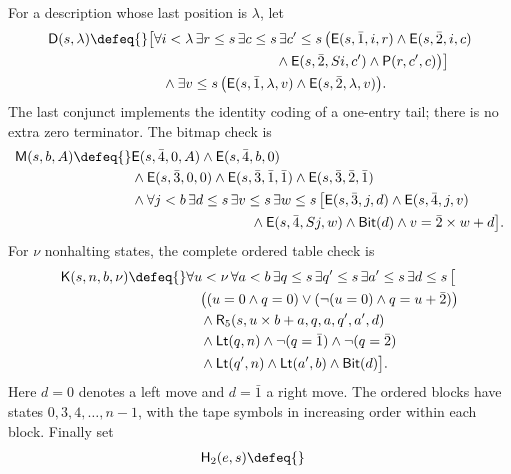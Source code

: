 \begin{definition}
For a description whose last position is \(\lambda\), let
\[
\begin{aligned}
 \mathsf D(s,\lambda)\defeq{}&
  \bigl[\forall i<\lambda\,\exists r\leq s\,
    \exists c\leq s\,\exists c'\leq s\,
    \bigl(\mathsf E(s,\bar1,i,r)\land
          \mathsf E(s,\bar2,i,c)\\
 &\hspace{32mm}\land\mathsf E(s,\bar2,Si,c')
          \land\mathsf P(r,c',c)\bigr)\bigr]\\
 &\quad\land\exists v\leq s\,
    \bigl(\mathsf E(s,\bar1,\lambda,v)
          \land\mathsf E(s,\bar2,\lambda,v)\bigr).
\end{aligned}
\]
The last conjunct implements the identity coding of a one-entry tail;
there is no extra zero terminator.  The bitmap check is
\[
\begin{aligned}
 \mathsf M(s,b,A)\defeq{}&
  \mathsf E(s,\bar4,0,A)\land\mathsf E(s,\bar4,b,0)\\
 &\land\mathsf E(s,\bar3,0,0)
       \land\mathsf E(s,\bar3,\bar1,\bar1)
       \land\mathsf E(s,\bar3,\bar2,\bar1)\\
 &\land\forall j<b\,\exists d\leq s\,\exists v\leq s\,
      \exists w\leq s\,
      \bigl[\mathsf E(s,\bar3,j,d)\land
            \mathsf E(s,\bar4,j,v)\\
 &\hspace{30mm}\land\mathsf E(s,\bar4,Sj,w)
            \land\mathsf{Bit}(d)\land v=\bar2\times w+d\bigr].
\end{aligned}
\]
For \(\nu\) nonhalting states, the complete ordered table check is
\[
\begin{aligned}
 \mathsf K(s,n,b,\nu)\defeq{}&
  \forall u<\nu\,\forall a<b\,
  \exists q\leq s\,\exists q'\leq s\,
  \exists a'\leq s\,\exists d\leq s\,\bigl[\\
 &\quad\bigl((u=0\land q=0)
           \lor(\neg(u=0)\land q=u+\bar2)\bigr)\\
 &\quad\land\mathsf R_5(s,u\times b+a,q,a,q',a',d)\\
 &\quad\land\mathsf{Lt}(q,n)
           \land\neg(q=\bar1)\land\neg(q=\bar2)\\
 &\quad\land\mathsf{Lt}(q',n)
           \land\mathsf{Lt}(a',b)\land\mathsf{Bit}(d)\bigr].
\end{aligned}
\]
Here \(d=0\) denotes a left move and \(d=\bar1\) a right
move.  The ordered blocks have states \(0,3,4,\ldots,n-1\), with
the tape symbols in increasing order within each block.  Finally set
\[
\begin{aligned}
 \mathsf H_2(e,s)\defeq{}&

\end{aligned}\]
\end{definition}
